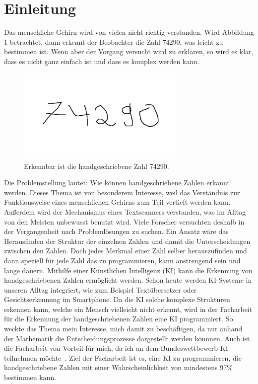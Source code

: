 \documentclass[11pt]{article}
\begin{document}
\section{Einleitung}
Das menschliche Gehirn wird von vielen nicht richtig verstanden. Wird Abbildung 1 betrachtet, dann erkennt der Beobachter die Zahl 74290,
was leicht zu bestimmen ist. Wenn aber der Vorgang versucht wird zu erklären, so wird es klar, dass es nicht ganz einfach ist
und dass es komplex werden kann.
\begin{figure}[h]
    \centering
    \includegraphics[width=230pt, keepaspectratio]{images/zahlen}
    \caption[Handgeschriebene]{Erkennbar ist die handgeschriebene Zahl 74290.}
\end{figure}
Die Problemstellung lautet: Wie können handgeschriebene Zahlen erkannt werden.
Dieses Thema ist von besonderem Interesse, weil das Verständnis zur Funktionsweise eines menschlichen Gehirns zum Teil vertieft werden kann.
Außerdem wird der Mechanismus eines Textscanners verstanden, was im Alltag von den Meisten unbewusst benutzt wird.
Viele Forscher versuchten deshalb in der Vergangenheit nach Problemlösungen zu suchen. Ein Ansatz wäre das Herausfinden
der Struktur der einzelnen Zahlen und damit die Unterscheidungen zwischen den Zahlen.
Doch jedes Merkmal einer Zahl selber herauszufinden und dann speziell für jede Zahl das zu programmieren, kann
anstrengend sein und lange dauern. Mithilfe einer Künstlichen Intelligenz (KI) kann die Erkennung von handgeschriebenen Zahlen ermöglicht werden. 
Schon heute werden KI-Systeme in unseren Alltag integriert, wie zum Beispiel Textübersetzer oder Gesichtserkennung im Smartphone. Da die KI solche
komplexe Strukturen erkennen kann, welche ein Mensch vielleicht nicht erkennt, wird in der Facharbeit für die Erkennung der handgeschriebenen Zahlen eine KI programmiert.
So weckte das Thema mein Interesse, mich damit zu beschäftigen, da nur anhand der Mathematik die Entscheidungsprozesse dargestellt werden könnnen.
Auch ist die Facharbeit von Vorteil für mich, da ich an dem Bundeswettbewerb-KI teilnehmen möchte~\cite{10}.
Ziel der Facharbeit ist es, eine KI zu programmieren, die handgeschriebene Zahlen mit einer Wahrscheinlichkeit von mindestens 97\% bestimmen kann.
\end{document}
